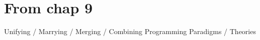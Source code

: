 \documentclass[thesis-solanki.tex]{subfiles}
\begin{document}
\begin{comment}
	\item Haskell Kanren \cite{website:haskellkanren} implementation from reasoned schemer for haskell
	\item Molog	 \cite{website:molog} implementation from reasoned schemer for haskell
	\item Mini Kanren \cite{website:minkanren} implementation from reasoned schemer to extend scheme with logic capabilities, few new constructs into scheme replicates the essence of prolog.
	\item Kanren \cite{website:kanren}, scheme library from the book 
	\end{enumerate}

\end{comment}

\section{\textbf{From chap 9}}

Unifying / Marrying / Merging / Combining Programming Paradigms / Theories
\end{document}

